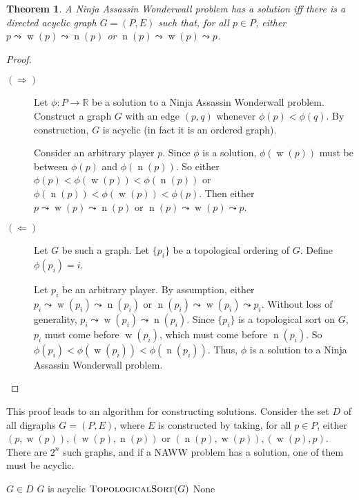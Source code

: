 \documentclass[12pt]{article}
\newtheorem*{thm}{Theorem}
\DeclareMathOperator{\w}{w}
\DeclareMathOperator{\n}{n}
\begin{document}
    \begin{thm}
    A Ninja Assassin Wonderwall problem has a solution iff there is a directed acyclic graph $G=(P,E)$ such that, for all $p\in P$, either  $p \leadsto \w(p) \leadsto \n(p)$ or $\n(p) \leadsto \w(p) \leadsto p$.
    \end{thm}
    \begin{proof} \mbox{}

    \begin{description}
    \item[$(\Rightarrow)$] Let $\phi: P \to \mathbb{R}$ be a solution to a Ninja Assassin Wonderwall problem. Construct a graph $G$ with an edge $(p,q)$ whenever $\phi(p)<\phi(q)$. By construction, $G$ is acyclic (in fact it is an ordered graph).

    Consider an arbitrary player $p$. Since $\phi$ is a solution, $\phi(\w(p))$ must be between $\phi(p)$ and $\phi(\n(p))$. So either $\phi(p) < \phi(\w(p)) < \phi(\n(p))$ or $\phi(\n(p)) < \phi(\w(p)) < \phi(p)$. Then either $p \leadsto \w(p) \leadsto \n(p)$ or $\n(p) \leadsto \w(p) \leadsto p$.

    \item[$(\Leftarrow)$] Let $G$ be such a graph. Let $\{p_i\}$ be a topological ordering of $G$. Define $\phi(p_i) = i$. 

    Let $p_i$ be an arbitrary player. By assumption, either $p_i \leadsto \w(p_i) \leadsto \n(p_i)$ or $\n(p_i) \leadsto \w(p_i) \leadsto p_i$. Without loss of generality, $p_i \leadsto \w(p_i) \leadsto \n(p_i)$. Since $\{p_i\}$ is a topological sort on $G$, $p_i$ must come before $\w(p_i)$, which must come before $\n(p_i)$. So $\phi(p_i) < \phi(\w(p_i)) < \phi(\n(p_i))$. Thus, $\phi$ is a solution to a Ninja Assassin Wonderwall problem.
    \end{description}
    \end{proof}

    This proof leads to an algorithm for constructing solutions. Consider the set $D$ of all digraphs $G=(P,E)$, where $E$ is constructed by taking, for all $p \in P$, either  $(p,\w(p)), (\w(p),\n(p))$ or $(\n(p),\w(p)),(\w(p),p)$. There are $2^n$ such graphs, and if a NAWW problem has a solution, one of them must be acyclic.

    \begin{codebox}
    \li \For $G\in D$
    \li     \Do
            \If $G$ is acyclic
    \li         \Do
                    \Return $\textnormal{\scshape TopologicalSort}(G)$
            \End
        \End
    \li \Return None
    \end{codebox}
        
\end{document}
